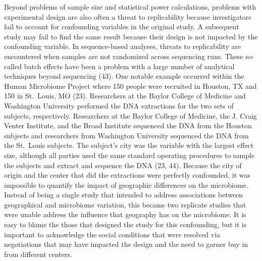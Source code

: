 \documentclass[]{article}
\begin{document}
Beyond problems of sample size and statistical power calculations,
problems with experimental design are also often a threat to
replicability because investigators fail to account for confounding
variables in the original study. A subsequent study may fail to find the
same result because their design is not impacted by the confounding
variable. In sequence-based analyses, threats to replicability are
encountered when samples are not randomized across sequencing runs.
These so-called batch effects have been a problem with a large number of
analytical techniques beyond sequencing (43). One notable example
occurred within the Human Microbiome Project where 150 people were
recruited in Houston, TX and 150 in St.~Louis, MO (23). Researchers at
the Baylor College of Medicine and Washington University performed the
DNA extractions for the two sets of subjects, respectively. Researchers
at the Baylor College of Medicine, the J. Craig Venter Institute, and
the Broad Institute sequenced the DNA from the Houston subjects and
researchers from Washington University sequenced the DNA from the
St.~Louis subjects. The subject's city was the variable with the largest
effect size, although all parties used the same standard operating
procedures to sample the subjects and extract and sequence the DNA (23,
44). Because the city of origin and the center that did the extractions
were perfectly confounded, it was impossible to quantify the impact of
geographic differences on the microbiome. Instead of being a single
study that intended to address associations between geographical and
microbiome variation, this became two replicate studies that were unable
address the influence that geography has on the microbiome. It is easy
to blame the those that designed the study for this confounding, but it
is important to acknowledge the social conditions that were resolved via
negotiations that may have impacted the design and the need to garner
buy in from different centers.
\end{document}
